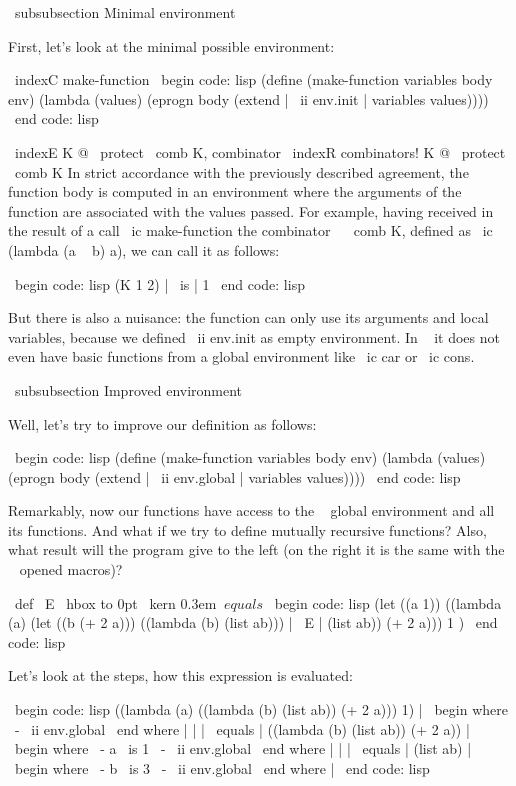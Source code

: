 {{\ subsubsection {Minimal environment}

First, let's look at the minimal possible environment:

\ indexC {make-function}
\ begin {code: lisp}
(define (make-function variables body env)
  (lambda (values)
    (eprogn body (extend | \ ii {env.init} | variables values))))
\ end {code: lisp}

\ indexE {K @ \ protect \ comb {K}, combinator}
\ indexR {combinators! K @ \ protect \ comb {K}}
In strict accordance with the previously described agreement, the function body is computed
in an environment where the arguments of the function are associated with the values ​​passed. For example,
having received in the result of a call \ ic {make-function} the combinator ~ \ comb {K}, defined
as \ ic {(lambda (a ~ b) a)}, we can call it as follows:

\ begin {code: lisp}
(K 1 2) | \ is | 1
\ end {code: lisp}

But there is also a nuisance: the function can only use its arguments and
local variables, because we defined \ ii {env.init} as empty
environment. In ~ it does not even have basic functions from a global environment like
\ ic {car} or \ ic {cons}.


\ subsubsection {Improved environment}

Well, let's try to improve our definition as follows:

\ begin {code: lisp}
(define (make-function variables body env)
  (lambda (values)
    (eprogn body (extend | \ ii {env.global} | variables values))))
\ end {code: lisp}

Remarkably, now our functions have access to the ~ global environment and all
its functions. And what if we try to define mutually recursive functions?
Also, what result will the program give to the left (on the right it is the same with the ~ opened
macros)?

{ \ def \ E { \ hbox to 0pt { \ kern 0.3em $ \ equals $ }}
\ begin {code: lisp}
(let ((a 1)) ((lambda (a)
  (let ((b (+ 2 a))) ((lambda (b)
    (list ab))) | \ E | (list ab))
                            (+ 2 a)))
                         1 )
\ end {code: lisp}}

Let's look at the steps, how this expression is evaluated:

\ begin {code: lisp}
((lambda (a) ((lambda (b) (list ab)) (+ 2 a))) 1) | \ begin {where}
                                                   \ -  \ ii {env.global}
                                                   \ end {where} |
| | \ equals | ((lambda (b) (list ab)) (+ 2 a)) | \ begin {where}
                                            \ - a { \ is } 1
                                            \ -  \ ii {env.global}
                                            \ end {where} |
| | \ equals | (list ab) | \ begin {where}
                     \ - b { \ is } 3
                     \ -  \ ii {env.global}
                     \ end {where} |
\ end {code: lisp}

}}
